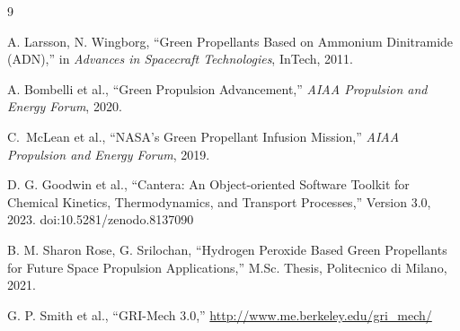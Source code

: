 \documentclass[review]{elsarticle}
\begin{document}

\begin{thebibliography}{9}

A. Larsson, N. Wingborg, 
``Green Propellants Based on Ammonium Dinitramide (ADN),'' 
in \textit{Advances in Spacecraft Technologies}, 
InTech, 2011.

A. Bombelli et al., 
``Green Propulsion Advancement,'' 
\textit{AIAA Propulsion and Energy Forum}, 2020.

C.~McLean et al., ``NASA's Green Propellant Infusion Mission,'' 
\textit{AIAA Propulsion and Energy Forum}, 2019.

D. G. Goodwin et al., 
``Cantera: An Object-oriented Software Toolkit for 
Chemical Kinetics, Thermodynamics, and Transport Processes,'' 
Version 3.0, 2023. 
doi:10.5281/zenodo.8137090

B. M. Sharon Rose, G. Srilochan, 
``Hydrogen Peroxide Based Green Propellants for Future 
Space Propulsion Applications,'' 
M.Sc. Thesis, Politecnico di Milano, 2021.

G. P. Smith et al., 
``GRI-Mech 3.0,'' 
\url{http://www.me.berkeley.edu/gri_mech/}

\end{thebibliography}
\end{document}
